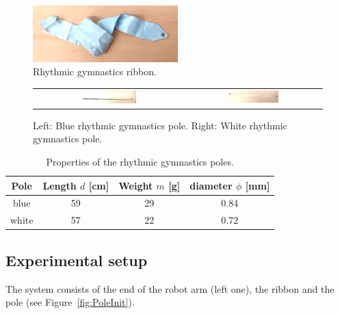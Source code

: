             \begin{figure}[h]
            \includegraphics[width=0.5\textwidth]{RibbonAdj.png}
            \centering
            \caption{Rhythmic gymnastics ribbon.}
            \label{fig:GymnasticRibbon}
            \end{figure}

            \begin{figure}
                \centering
                \begin{tabular}{cc}
                \includegraphics[width=0.39\textwidth]{BluePoleAdj.png}
                &
                \includegraphics[width=0.39\textwidth]{WhitePoleAdj.png}
                \end{tabular}
                \caption{Left: Blue rhythmic gymnastics pole. Right: White rhythmic gymnastics pole.}
                \label{fig:GymnasticPoles}
            \end{figure}


            \begin{table}[h]\centering
            \begin{tabular}{@{}cccc@{}}\toprule
            Pole & Length $d$ [cm] & Weight $m$ [g] & diameter $\phi$ [mm] \\ \midrule
            blue & 59 & 29 & 0.84\\
            white & 57 & 22 & 0.72\\

            \bottomrule
            \end{tabular}
            \caption{Properties of the rhythmic gymnastics poles.}
            \label{table:PoleProperties}
            \end{table}


        \subsection{Experimental setup}
            The system consists of the end of the robot arm (left one), the ribbon and the pole (see Figure~\ref{fig:PoleInit}).

